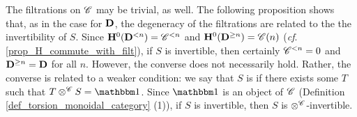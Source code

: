 The filtrations on $\Cat{C}$ may be trivial, as well. The following
proposition shows that, as in the case for $\DCat$, the degeneracy
of the filtrations are related to the the invertibility of $S$.
Since $\HH^0(\Corad{n}{\DCat}) = \Corad{n}{\Cat{C}}$ and
$\HH^0(\Prerad{n}{\DCat}) = \SGFilt{n}{\Cat{C}}$ (\emph{cf}. 
\ref{prop_H_commute_with_filt}), if $S$ is invertible, then certainly
$\Corad{n}{\Cat{C}} = 0$ and $\Prerad{n}{\DCat} = \DCat$ for all $n$.
However, the converse does not necessarily hold. Rather, the converse
is related to a weaker condition: we say that $S$ is 
 if there exists some $T$ such
that $T \tensor^{\Cat{C}} S = \Unit$. Since $\Unit$ is an object of
$\Cat{C}$ (Definition \ref{def_torsion_monoidal_category} (1)), if
$S$ is invertible, then $S$ is $\tensor^{\Cat{C}}$-invertible.

